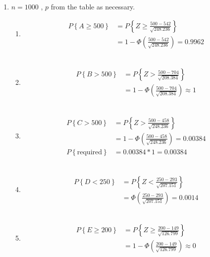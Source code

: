 \begin{enumerate}
	
	\item $ n = 1000 $ , $ p $ from the table as necessary. \\
	
		\begin{enumerate}
			\item 			
			\begin{align}
				P \left\{A \geq 500 \right\} &= P \left\{Z \geq \frac{500 - 542}{\sqrt{248.236}} \right\} \nonumber \\
				&= 1 - \Phi \left( \frac{500 - 542}{\sqrt{248.236}} \right) = 0.9962
			\end{align} \\
			
			\item 
			\begin{align}
				P \left\{B > 500 \right\} &= P \left\{Z > \frac{500 - 704}{\sqrt{208.384}} \right\} \nonumber \\
				&= 1 - \Phi \left( \frac{500 - 704}{\sqrt{208.384}} \right) \approx 1
			\end{align} \\
			
			\item 
			\begin{align}
				P \left\{C > 500 \right\} &= P \left\{Z > \frac{500 - 458}{\sqrt{248.236}} \right\} \nonumber \\
				&= 1 - \Phi \left( \frac{500 - 458}{\sqrt{248.236}} \right) = 0.00384 \nonumber \\
				P\left\{ \text{required} \right\} &= 0.00384 * 1 = 0.00384
			\end{align} \\
			
			\item 
			\begin{align}
				P \left\{D < 250 \right\} &= P \left\{Z < \frac{250 - 293}{\sqrt{207.151}} \right\} \nonumber \\
				&= \Phi \left( \frac{250 - 293}{\sqrt{207.151}} \right) = 0.0014
			\end{align} \\
			
			\item 
			\begin{align}
				P \left\{E \geq 200 \right\} &= P \left\{Z \geq \frac{200 - 149}{\sqrt{126.799}} \right\} \nonumber \\
				&= 1 - \Phi \left( \frac{200 - 149}{\sqrt{126.799}} \right) \approx 0
			\end{align} \\
			

\end{enumerate}
\end{enumerate}
